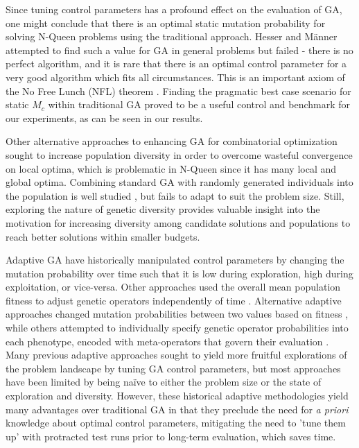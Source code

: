 \documentclass[conference]{IEEEtran}
\begin{document}
Since tuning control parameters has a profound effect on the evaluation of GA, one might conclude that there is an optimal static mutation probability \cite{cit:4} for solving N-Queen problems using the traditional approach. Hesser and M\"{a}nner \cite{cit:14} attempted to find such a value for GA in general problems but failed - there is no perfect algorithm, and it is rare that there is an optimal control parameter for a very good algorithm which fits all circumstances. This is an important axiom of the No Free Lunch (NFL) theorem \cite{cit:6}. Finding the pragmatic best case scenario for static $M_{c}$ within traditional GA proved to be a useful control and benchmark for our experiments, as can be seen in our results.

Other alternative approaches to enhancing GA for combinatorial optimization sought to increase population diversity in order to overcome wasteful convergence on local optima, which is problematic in N-Queen since it has many local and global optima. Combining standard GA with randomly generated individuals into the population is well studied \cite{cit:12}, but fails to adapt to suit the problem size. Still, exploring the nature of genetic diversity provides valuable insight into the motivation for increasing diversity among candidate solutions and populations to reach better solutions within smaller budgets.

Adaptive GA have historically manipulated control parameters by changing the mutation probability over time \cite{cit:12} such that it is low during exploration, high during exploitation, or vice-versa. Other approaches used the overall mean population fitness to adjust genetic operators independently of time \cite{cit:11,cit:15,cit:7}. Alternative adaptive approaches changed mutation probabilities between two values based on fitness \cite{cit:15}, while others attempted to individually specify genetic operator probabilities into each phenotype, encoded with meta-operators that govern their evaluation \cite{cit:5}. Many previous adaptive approaches sought to yield more fruitful explorations of the problem landscape by tuning GA control parameters, but most approaches have been limited by being na\"{i}ve to either the problem size or the state of exploration and diversity. However, these historical adaptive methodologies yield many advantages over traditional GA in that they preclude the need for \textit{a priori} knowledge about optimal control parameters, mitigating the need to 'tune them up' with protracted test runs prior to long-term evaluation, which saves time.
\end{document}
